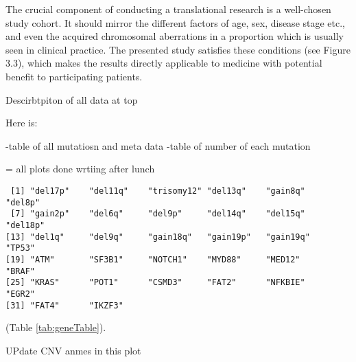 \documentclass[11pt, a4paper, twosided]{book}
\begin{document}
The crucial component of conducting a translational research is a well-chosen
study cohort. It should mirror the different factors of age, sex, disease stage etc.,
and even the acquired chromosomal aberrations in a proportion which is usually
seen in clinical practice. The presented study satisfies these conditions (see Figure
3.3), which makes the results directly applicable to medicine with potential benefit
to participating patients.

Descirbtpiton of all data at top

Here is:

-table of all mutatiosn and meta data
-table of number of each mutation

= all plots done
wrtiing after lunch
\begin{verbatim}
 [1] "del17p"    "del11q"    "trisomy12" "del13q"    "gain8q"    "del8p"    
 [7] "gain2p"    "del6q"     "del9p"     "del14q"    "del15q"    "del18p"   
[13] "del1q"     "del9q"     "gain18q"   "gain19p"   "gain19q"   "TP53"     
[19] "ATM"       "SF3B1"     "NOTCH1"    "MYD88"     "MED12"     "BRAF"     
[25] "KRAS"      "POT1"      "CSMD3"     "FAT2"      "NFKBIE"    "EGR2"     
[31] "FAT4"      "IKZF3"    
\end{verbatim}
(Table \ref{tab:geneTable}).

UPdate CNV anmes in this plot
\end{document}
